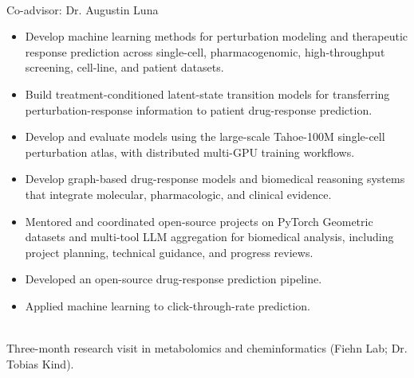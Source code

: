 \documentclass[11pt]{article}
\begin{document}
\begin{itemize}[leftmargin=*]
    \\
    Co-advisor: Dr. Augustin Luna
    \begin{itemize}
        \item Develop machine learning methods for perturbation modeling and therapeutic response prediction across single-cell, pharmacogenomic, high-throughput screening, cell-line, and patient datasets.
        \item Build treatment-conditioned latent-state transition models for transferring perturbation-response information to patient drug-response prediction.
        \item Develop and evaluate models using the large-scale Tahoe-100M single-cell perturbation atlas, with distributed multi-GPU training workflows.
        \item Develop graph-based drug-response models and biomedical reasoning systems that integrate molecular, pharmacologic, and clinical evidence.
    \end{itemize}

    \begin{itemize}
        \item Mentored and coordinated open-source projects on PyTorch Geometric datasets and multi-tool LLM aggregation for biomedical analysis, including project planning, technical guidance, and progress reviews.
    \end{itemize}

    \begin{itemize}
        \item Developed an open-source drug-response prediction pipeline.
    \end{itemize}

    \begin{itemize}
        \item Applied machine learning to click-through-rate prediction.
    \end{itemize}

    \\[-1pt]
    {\small Three-month research visit in metabolomics and cheminformatics (Fiehn Lab; Dr. Tobias Kind).}
\end{itemize}
\end{document}
